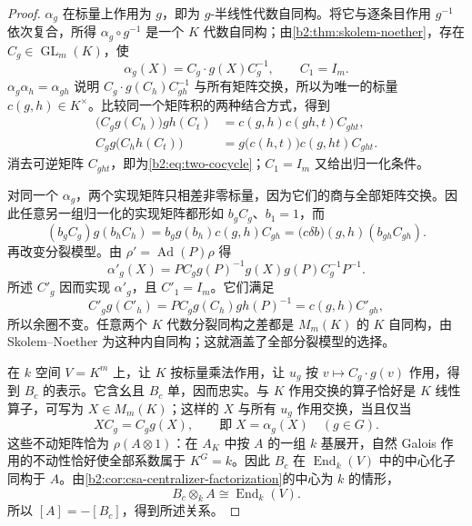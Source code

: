 \begin{proof}
	\(\alpha_g\) 在标量上作用为 \(g\)，即为 \(g\)-半线性代数自同构。将它与逐条目作用 \(g^{-1}\) 依次复合，所得 \(\alpha_g\circ g^{-1}\) 是一个 \(K\) 代数自同构；由\cref{b2:thm:skolem-noether}，存在 \(C_g\in\operatorname{GL}_m(K)\)，使
	\begin{equation}\label{b2:eq:brauer-semilinear-matrices}
		\alpha_g(X)=C_g\cdot g(X)C_g^{-1},\qquad C_1=I_m.
	\end{equation}
	\(\alpha_g\alpha_h=\alpha_{gh}\) 说明 \(C_g\cdot g(C_h)C_{gh}^{-1}\) 与所有矩阵交换，所以为唯一的标量 \(c(g,h)\in K^\times\)。比较同一个矩阵积的两种结合方式，得到
	\[
		\begin{aligned}
			\bigl(C_g g(C_h)\bigr)gh(C_t) &=c(g,h)c(gh,t)C_{ght},\\
			C_g g\bigl(C_h h(C_t)\bigr) &=g\bigl(c(h,t)\bigr)c(g,ht)C_{ght}.
		\end{aligned}
	\]
	消去可逆矩阵 \(C_{ght}\)，即为\eqref{b2:eq:two-cocycle}；\(C_1=I_m\) 又给出归一化条件。

	对同一个 \(\alpha_g\)，两个实现矩阵只相差非零标量，因为它们的商与全部矩阵交换。因此任意另一组归一化的实现矩阵都形如 \(b_gC_g\)、\(b_1=1\)，而
	\[
		(b_gC_g)g(b_hC_h) =b_g g(b_h)c(g,h)C_{gh} =\bigl(c\delta b\bigr)(g,h)(b_{gh}C_{gh}).
	\]
	再改变分裂模型。由 \(\rho'=\operatorname{Ad}(P)\rho\) 得
	\[
		\alpha'_g(X) =P C_g g(P)^{-1}g(X)g(P)C_g^{-1}P^{-1}.
	\]
	所述 \(C'_g\) 因而实现 \(\alpha'_g\)，且 \(C'_1=I_m\)。它们满足
	\[
		C'_g g(C'_h) =PC_g g(C_h)gh(P)^{-1} =c(g,h)C'_{gh},
	\]
	所以余圈不变。任意两个 \(K\) 代数分裂同构之差都是 \(M_m(K)\) 的 \(K\) 自同构，由 Skolem--Noether 为这种内自同构；这就涵盖了全部分裂模型的选择。

	在 \(k\) 空间 \(V=K^m\) 上，让 \(K\) 按标量乘法作用，让 \(u_g\) 按 \(v\mapsto C_g\cdot g(v)\) 作用，得到 \(B_c\) 的表示。它含幺且 \(B_c\) 单，因而忠实。与 \(K\) 作用交换的算子恰好是 \(K\) 线性算子，可写为 \(X\in M_m(K)\)；这样的 \(X\) 与所有 \(u_g\) 作用交换，当且仅当
	\[
		XC_g=C_g g(X),\qquad\text{即}\;X=\alpha_g(X)\quad(g\in G).
	\]
	这些不动矩阵恰为 \(\rho(A\otimes1)\)：在 \(A_K\) 中按 \(A\) 的一组 \(k\) 基展开，自然 Galois 作用的不动性恰好使全部系数属于 \(K^G=k\)。因此 \(B_c\) 在 \(\operatorname{End}_k(V)\) 中的中心化子同构于 \(A\)。由\cref{b2:cor:csa-centralizer-factorization}的中心为 \(k\) 的情形，
	\[
		B_c\otimes_k A\cong\operatorname{End}_k(V).
	\]
	所以 \([A]=-[B_c]\)，得到所述关系。
\end{proof}

